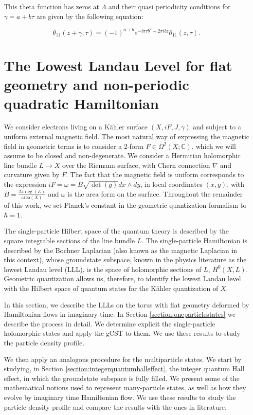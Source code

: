 \documentclass[a4paper,11pt]{article}
\begin{document}
This theta function has zeros at $\Lambda$ and their quasi periodicity conditions for $\gamma = a+b\tau$ are given by the following equation:

\begin{equation}
\theta_{11}(z+\gamma,\tau) = (-1)^{a+b}e^{-i\pi\tau b^2-2\pi ibz}\theta_{11}(z,\tau). 
\label{eq:theta11quasiperiodicity}
\end{equation}


\section{The Lowest Landau Level for flat geometry and non-periodic quadratic Hamiltonian}
\label{sec:flat_geometry}
We consider electrons living on a Kähler surface $(X,iF, J,\gamma)$ and subject to a
uniform external magnetic field. The most natural way of expressing the magnetic field in geometric terms is to consider a 2-form $F\in\Omega^{2}(X;\mathbb{C})$, which we will assume to be closed and non-degenerate. We consider a Hermitian holomorphic line bundle $L\rightarrow X$ over the Riemann surface, with  Chern connection 
$\nabla$ and curvature given by $F$. The fact that the magnetic field is uniform corresponds to the expression  $iF = \omega = B\sqrt{\det(g)}dx\wedge dy$, in local coordinates $(x,y)$, with $B = \frac{ 2\pi\deg(L)}{\mathrm{area}(X)}$ and $\omega$ is the area form on the surface. Throughout the remainder of this work, we set Planck's constant in the geometric quantization formalism to $\hbar = 1$.


The single-particle Hilbert space of the quantum theory is described by the square integrable sections of the line bundle $L$. The single-particle Hamiltonian is described
by the Bochner Laplacian (also known as the magnetic Laplacian in this context), whose groundstate subspace, known in the physics literature
as the lowest Landau level (LLL), is the space of holomorphic sections of $L$,  $H^{0}(X,L)$.  Geometric quantization allows us, therefore, to identify the lowest Landau level with the Hilbert
space of quantum states for the Kähler quantization of $X$.

In this section, we describe the LLLs on the torus with flat geometry deformed by Hamiltonian flows in imaginary time. In Section \ref{section:oneparticlestates} we describe the process in detail. We determine explicit the single-particle holomorphic states and apply the gCST to them. We use these results to study the particle density profile. 

We then apply an analogous procedure for the multiparticle states. We start by studying, in Section \ref{section:integerquantumhalleffect}, the integer quantum Hall effect, in which the groundstate subspace is fully filled. 
We present some of the mathematical notions used to represent many-particle states, as well as how they evolve by imaginary time Hamiltonian flow. We use these results to study the particle density profile and compare the results with the ones in literature.
\end{document}
